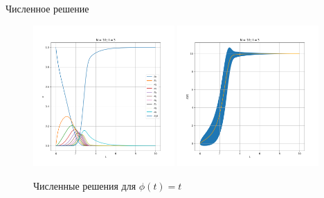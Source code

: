 \begin{frame}{Численное решение}
{			\begin{figure}
				\centering
				\includegraphics[width=0.48\textwidth, keepaspectratio]{../img/numeric_sol/probabilities_N_10_lambda_3_lin.png}
				\includegraphics[width=0.48\textwidth, keepaspectratio]{../img/numeric_sol/avers_N_10_lambda_3_lin.png}
				\caption{Численные решения для $ \phi(t) = t $}
			\end{figure}
		}
		
\end{frame}
